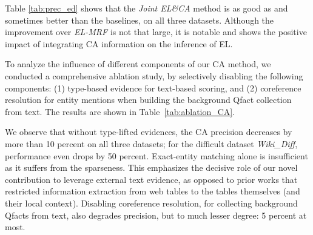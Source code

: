 Table \ref{tab:prec_ed} shows that the \textit{Joint EL\&CA}
method is 
 as good as and sometimes better than the baselines,
on all three datasets.
Although the improvement over \textit{EL-MRF} is not that large, it is notable and shows the positive impact of integrating CA information on the inference of EL.

\vspace{0.1cm}
 To analyze the influence of different components of %
our CA method,
we conducted a comprehensive ablation study, by selectively disabling the following components:
(1) type-based evidence for text-based scoring, and
(2) coreference resolution for entity mentions when building the background Qfact collection from text.
The results are shown in Table~\ref{tab:ablation_CA}.  

We observe that without type-lifted evidences, the CA precision decreases by more than 10 percent on all three datasets; for the difficult dataset \textit{Wiki\_Diff}, performance even drops by 50 percent. 
Exact-entity matching alone is 
insufficient as it suffers from the sparseness.
This emphasizes the decisive role of our novel contribution to
leverage external text evidence, as opposed to prior works that restricted information extraction from web tables to the tables themselves (and their local context).
%
Disabling coreference resolution, for collecting background Qfacts from text, also degrades precision, but to much lesser degree: 5 percent at most.

